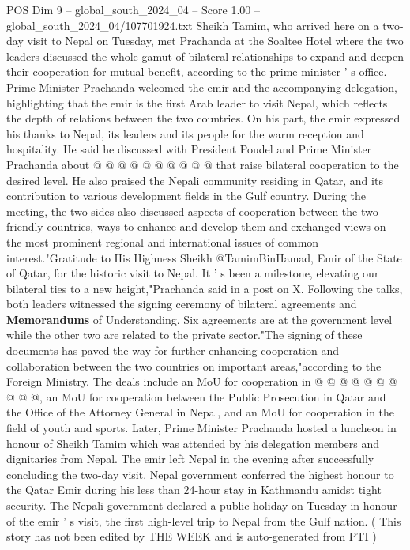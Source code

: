 \begin{textsample}{POS Dim 9 – global\_south\_2024\_04 – Score 1.00 – global\_south\_2024\_04/107701924.txt}
Sheikh Tamim, who arrived here on a two-day visit to Nepal on Tuesday, met Prachanda at the Soaltee Hotel where the two leaders discussed the whole gamut of bilateral relationships to expand and deepen their cooperation for mutual benefit, according to the prime minister ' s office.
Prime Minister Prachanda welcomed the emir and the accompanying delegation, highlighting that the emir is the first Arab leader to visit Nepal, which reflects the depth of relations between the two countries.
On his part, the emir expressed his thanks to Nepal, its leaders and its people for the warm reception and hospitality.
He said he discussed with President Poudel and Prime Minister Prachanda about @ @ @ @ @ @ @ @ @ @ that raise bilateral cooperation to the desired level.
He also praised the Nepali community residing in Qatar, and its contribution to various development fields in the Gulf country.
During the meeting, the two sides also discussed aspects of cooperation between the two friendly countries, ways to enhance and develop them and exchanged views on the most prominent regional and international issues of common interest."Gratitude to His Highness Sheikh @TamimBinHamad, Emir of the State of Qatar, for the historic visit to Nepal.
It ' s been a milestone, elevating our bilateral ties to a new height,"Prachanda said in a post on X.
Following the talks, both leaders witnessed the signing ceremony of bilateral agreements and \textbf{Memorandums} of Understanding.
Six agreements are at the government level while the other two are related to the private sector."The signing of these documents has paved the way for further enhancing cooperation and collaboration between the two countries on important areas,"according to the Foreign Ministry.
The deals include an MoU for cooperation in @ @ @ @ @ @ @ @ @ @, an MoU for cooperation between the Public Prosecution in Qatar and the Office of the Attorney General in Nepal, and an MoU for cooperation in the field of youth and sports.
Later, Prime Minister Prachanda hosted a luncheon in honour of Sheikh Tamim which was attended by his delegation members and dignitaries from Nepal.
The emir left Nepal in the evening after successfully concluding the two-day visit.
Nepal government conferred the highest honour to the Qatar Emir during his less than 24-hour stay in Kathmandu amidst tight security.
The Nepali government declared a public holiday on Tuesday in honour of the emir ' s visit, the first high-level trip to Nepal from the Gulf nation. ( This story has not been edited by THE WEEK and is auto-generated from PTI )

\end{textsample}
